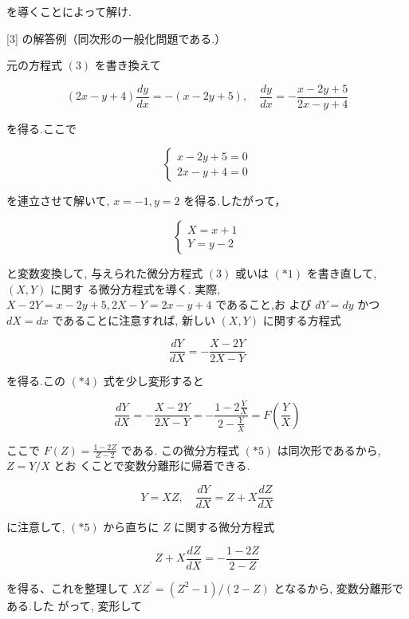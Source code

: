 \documentclass[10pt]{article}
\begin{document}
を導くことによって解け.

[3] の解答例（同次形の一般化問題である.）

元の方程式 $(3)$ を書き換えて


\begin{equation*}
(2 x-y+4) \frac{d y}{d x}=-(x-2 y+5), \quad \frac{d y}{d x}=-\frac{x-2 y+5}{2 x-y+4} \tag{*1}
\end{equation*}


を得る.ここで

\[
\left\{\begin{array}{l}
x-2 y+5=0  \tag{*2}\\
2 x-y+4=0
\end{array}\right.
\]

を連立させて解いて, $x=-1, y=2$ を得る.したがって，

\[
\left\{\begin{array}{l}
X=x+1  \tag{*3}\\
Y=y-2
\end{array}\right.
\]

と変数変換して, 与えられた微分方程式 $(3)$ 或いは $(* 1)$ を書き直して, $(X, Y)$ に関す る微分方程式を導く. 実際, $X-2 Y=x-2 y+5,2 X-Y=2 x-y+4$ であること,お よび $d Y=d y$ かつ $d X=d x$ であることに注意すれば, 新しい $(X, Y)$ に関する方程式


\begin{equation*}
\frac{d Y}{d X}=-\frac{X-2 Y}{2 X-Y} \tag{*4}
\end{equation*}


を得る.この $(* 4)$ 式を少し変形すると


\begin{equation*}
\frac{d Y}{d X}=-\frac{X-2 Y}{2 X-Y}=-\frac{1-2 \frac{Y}{X}}{2-\frac{Y}{X}}=F\left(\frac{Y}{X}\right) \tag{*5}
\end{equation*}


ここで $F(Z)=\frac{1-2 Z}{Z-2}$ である. この微分方程式 $(* 5)$ は同次形であるから, $Z=Y / X$ とお くことで変数分離形に帰着できる.

$$
Y=X Z, \quad \frac{d Y}{d X}=Z+X \frac{d Z}{d X}
$$

に注意して, $(* 5)$ から直ちに $Z$ に関する微分方程式


\begin{equation*}
Z+X \frac{d Z}{d X}=-\frac{1-2 Z}{2-Z} \tag{*6}
\end{equation*}


を得る、これを整理して $X Z^{\prime}=\left(Z^{2}-1\right) /(2-Z)$ となるから, 変数分離形である.した がって, 変形して
\end{document}
